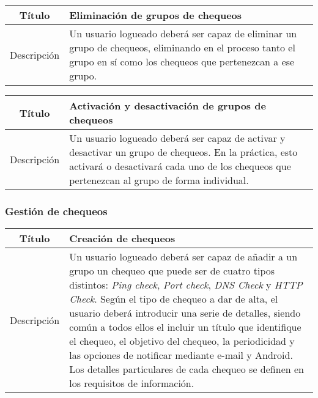\begin{center}
  
  \begin{tabularx}{\textwidth}{|c|X|}
    \hline
    Título & Eliminación de grupos de chequeos \\

    \hline

    Descripción & Un usuario logueado deberá ser capaz de eliminar un grupo de
    chequeos, eliminando en el proceso tanto el grupo en sí como los chequeos
    que pertenezcan a ese grupo. \\

    \hline
  \end{tabularx}
\end{center}

\begin{center}
  
  \begin{tabularx}{\textwidth}{|c|X|}
    \hline
    Título & Activación y desactivación de grupos de chequeos \\

    \hline

    Descripción & Un usuario logueado deberá ser capaz de activar y desactivar
    un grupo de chequeos. En la práctica, esto activará o desactivará cada uno
    de los chequeos que pertenezcan al grupo de forma individual. \\

    \hline
  \end{tabularx}
\end{center}

\FloatBarrier
\subsubsection{Gestión de chequeos}

\begin{center}
  
  \begin{tabularx}{\textwidth}{|c|X|}
    \hline
    Título & Creación de chequeos \\

    \hline

    Descripción & Un usuario logueado deberá ser capaz de añadir a un grupo un
    chequeo que puede ser de cuatro tipos distintos: \textit{Ping check},
    \textit{Port check}, \textit{DNS Check} y \textit{HTTP Check}. Según el tipo
    de chequeo a dar de alta, el usuario deberá introducir una serie de
    detalles, siendo común a todos ellos el incluir un título que identifique el
    chequeo, el objetivo del chequeo, la periodicidad y las opciones de
    notificar mediante e-mail y Android.  Los detalles particulares de cada
    chequeo se definen en los
    requisitos de información. \\

    \hline
  \end{tabularx}
\end{center}



